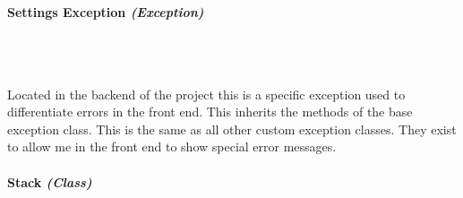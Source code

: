 \begin{FlushLeft}
    \begin{figure}[H]
        \centering
    \end{figure}\\

    \bk

    \paragraph{Settings Exception \textit{(Exception)}} \mbox{} \\

    \begin{figure}[H]
        \centering
    \end{figure}\\
    Located in the backend of the project this is a specific exception used to differentiate errors in the front end. This inherits the methods of the base exception class. This is the same as all other custom exception classes. They exist to allow me in the front end to show special error messages.
    \bk

    \paragraph{Stack \textit{(Class)}} \mbox{} \\


\end{FlushLeft}

